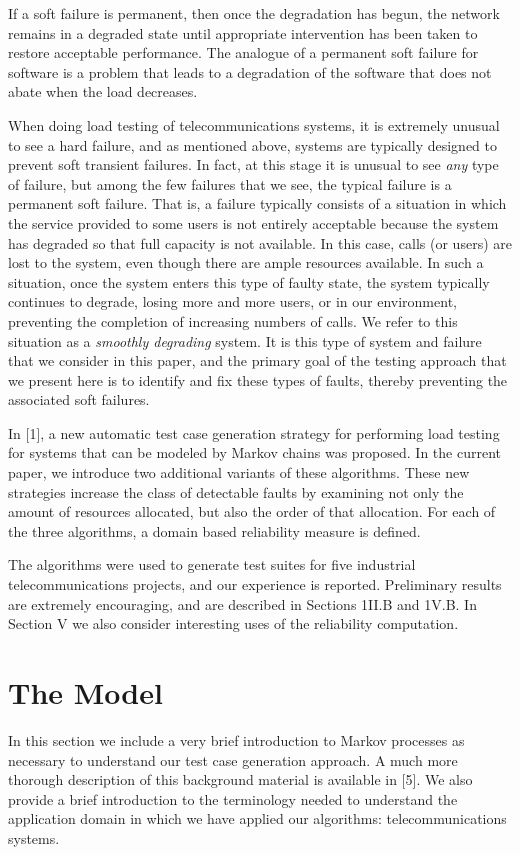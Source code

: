 \documentclass[journal, twoside]{IEEEtran}
\begin{document}
 If a soft failure is permanent, then once the degradation has
begun, the network remains in a degraded state until appropriate intervention has been taken to restore acceptable performance. The analogue of a permanent soft failure for software is
a problem that leads to a degradation of the software that does
not abate when the load decreases.

\IEEEpubidadjcol
When doing load testing of telecommunications systems, it
is extremely unusual to see a hard failure, and as mentioned
above, systems are typically designed to prevent soft transient
failures. In fact, at this stage it is unusual to see \textit{any} type of
failure, but among the few failures that we see, the typical failure is a permanent soft failure. That is, a failure typically consists of a situation in which the service provided to some users
is not entirely acceptable because the system has degraded so
that full capacity is not available. In this case, calls (or users)
are lost to the system, even though there are ample resources
available. In such a situation, once the system enters this type
of faulty state, the system typically continues to degrade, losing more and more users, or in our environment, preventing
the completion of increasing numbers of calls. We refer to this
situation as a \textit{smoothly degrading} system. It is this type of
system and failure that we consider in this paper, and the primary goal of the testing approach that we present here is to
identify and fix these types of faults, thereby preventing the
associated soft failures.
\IEEEpubidadjcol

In [1], a new automatic test case generation strategy for performing load testing for systems that can be modeled by
Markov chains was proposed. In the current paper, we introduce two additional variants of these algorithms. These new
strategies increase the class of detectable faults by examining
not only the amount of resources allocated, but also the order
of that allocation. For each of the three algorithms, a domain based reliability measure is defined.

The algorithms were used to generate test suites for five industrial telecommunications projects, and our experience is
reported. Preliminary results are extremely encouraging, and
are described in Sections 1II.B and 1V.B. In Section V we also
consider interesting uses of the reliability computation. 
\section{The Model}
In this section we include a very brief introduction to
Markov processes as necessary to understand our test case
generation approach. A much more thorough description of
this background material is available in [5]. We also provide a
brief introduction to the terminology needed to understand the
application domain in which we have applied our algorithms:
telecommunications systems.
\end{document}

